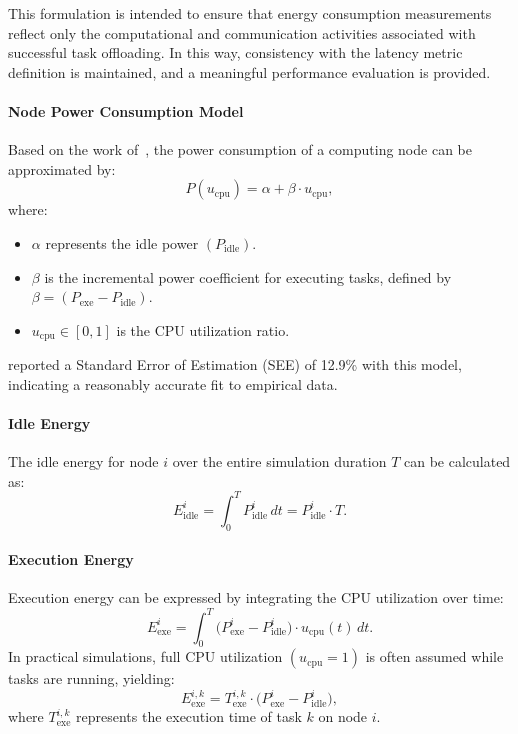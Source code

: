 \documentclass[preprint,3p,authoryear]{elsarticle}
\begin{document}
This formulation is intended to ensure that energy consumption measurements reflect only the computational and communication activities associated with successful task offloading. In this way, consistency with the latency metric definition is maintained, and a meaningful performance evaluation is provided.

\paragraph{Node Power Consumption Model}
Based on the work of~, the power consumption of a computing node can be approximated by:
\begin{equation}
P(u_{\text{cpu}}) = \alpha + \beta \cdot u_{\text{cpu}},
\end{equation}
where:
\begin{itemize}
    \item \(\alpha\) represents the idle power \((P_{\text{idle}})\).
    \item \(\beta\) is the incremental power coefficient for executing tasks, defined by \(\beta = (P_{\text{exe}} - P_{\text{idle}})\).
    \item \(u_{\text{cpu}} \in [0,1]\) is the CPU utilization ratio.
\end{itemize}

\cite{ismail_computing_2021} reported a Standard Error of Estimation (SEE) of 12.9\% with this model, indicating a reasonably accurate fit to empirical data.

\paragraph{Idle Energy}
The idle energy for node \(i\) over the entire simulation duration \(T\) can be calculated as:
\begin{equation}
E_{\text{idle}}^{i} = \int_{0}^{T} P_{\text{idle}}^{i} \, dt = P_{\text{idle}}^{i} \cdot T.
\end{equation}

\paragraph{Execution Energy}
Execution energy can be expressed by integrating the CPU utilization over time:
\begin{equation}
E_{\text{exe}}^{i} = \int_{0}^{T} \bigl(P_{\text{exe}}^{i} - P_{\text{idle}}^{i}\bigr) \cdot u_{\text{cpu}}(t) \, dt.
\end{equation}
In practical simulations, full CPU utilization \((u_{\text{cpu}} = 1)\) is often assumed while tasks are running, yielding:
\begin{equation}
E_{\text{exe}}^{i,k} = T_{\text{exe}}^{i,k} \cdot \bigl(P_{\text{exe}}^{i} - P_{\text{idle}}^{i}\bigr),
\end{equation}
where \(T_{\text{exe}}^{i,k}\) represents the execution time of task \(k\) on node \(i\).
\end{document}
